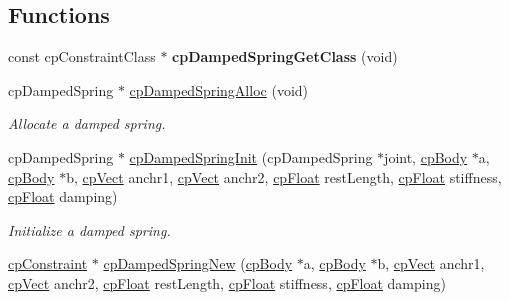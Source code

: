 \subsection*{Functions}
\begin{DoxyCompactItemize}
\item 
\hypertarget{group__cp_damped_spring_ga35ce65a4f11813f9ba2eaf53c0c45d6b}{const cp\-Constraint\-Class $\ast$ {\bfseries cp\-Damped\-Spring\-Get\-Class} (void)}\label{group__cp_damped_spring_ga35ce65a4f11813f9ba2eaf53c0c45d6b}

\item 
\hypertarget{group__cp_damped_spring_ga09c3c3729dd0e2b920948afa15cbd9e1}{cp\-Damped\-Spring $\ast$ \hyperlink{group__cp_damped_spring_ga09c3c3729dd0e2b920948afa15cbd9e1}{cp\-Damped\-Spring\-Alloc} (void)}\label{group__cp_damped_spring_ga09c3c3729dd0e2b920948afa15cbd9e1}

\begin{DoxyCompactList}\small\item\em Allocate a damped spring. \end{DoxyCompactList}\item 
\hypertarget{group__cp_damped_spring_gac85a83615b67b539dddb16929e494c36}{cp\-Damped\-Spring $\ast$ \hyperlink{group__cp_damped_spring_gac85a83615b67b539dddb16929e494c36}{cp\-Damped\-Spring\-Init} (cp\-Damped\-Spring $\ast$joint, \hyperlink{structcp_body}{cp\-Body} $\ast$a, \hyperlink{structcp_body}{cp\-Body} $\ast$b, \hyperlink{structcp_vect}{cp\-Vect} anchr1, \hyperlink{structcp_vect}{cp\-Vect} anchr2, \hyperlink{group__basic_types_gac1ed65573e035bf892505768c852d8d3}{cp\-Float} rest\-Length, \hyperlink{group__basic_types_gac1ed65573e035bf892505768c852d8d3}{cp\-Float} stiffness, \hyperlink{group__basic_types_gac1ed65573e035bf892505768c852d8d3}{cp\-Float} damping)}\label{group__cp_damped_spring_gac85a83615b67b539dddb16929e494c36}

\begin{DoxyCompactList}\small\item\em Initialize a damped spring. \end{DoxyCompactList}\item 
\hypertarget{group__cp_damped_spring_gacc53f549a34c60819a0f50e523edc553}{\hyperlink{structcp_constraint}{cp\-Constraint} $\ast$ \hyperlink{group__cp_damped_spring_gacc53f549a34c60819a0f50e523edc553}{cp\-Damped\-Spring\-New} (\hyperlink{structcp_body}{cp\-Body} $\ast$a, \hyperlink{structcp_body}{cp\-Body} $\ast$b, \hyperlink{structcp_vect}{cp\-Vect} anchr1, \hyperlink{structcp_vect}{cp\-Vect} anchr2, \hyperlink{group__basic_types_gac1ed65573e035bf892505768c852d8d3}{cp\-Float} rest\-Length, \hyperlink{group__basic_types_gac1ed65573e035bf892505768c852d8d3}{cp\-Float} stiffness, \hyperlink{group__basic_types_gac1ed65573e035bf892505768c852d8d3}{cp\-Float} damping)}\label{group__cp_damped_spring_gacc53f549a34c60819a0f50e523edc553}


\end{DoxyCompactItemize}

